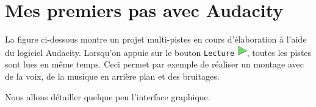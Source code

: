 \section{Mes premiers pas avec Audacity}\label{Son1Interface}

La figure ci-dessous montre un projet multi-pistes en cours d'élaboration à l'aide du logiciel Audacity. Lorsqu'on appuie sur le bouton \texttt{Lecture} \includegraphics[width=.4cm]{./images/son01/boutonPlay}, toutes les pistes sont lues en même temps. Ceci permet par exemple de réaliser un montage avec de la voix, de la musique en arrière plan et des bruitages.


Nous allons détailler quelque peu l'interface graphique.\\

